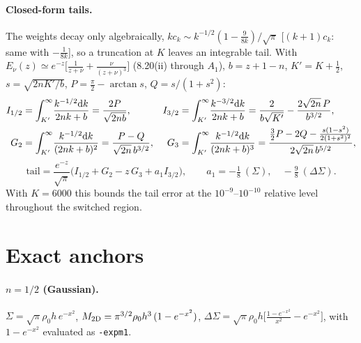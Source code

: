 \documentclass{article}
\begin{document}
\paragraph{Closed-form tails.} The weights decay only algebraically,
$k c_k \sim k^{-1/2}(1-\tfrac{9}{8k})/\sqrt\pi$ [$(k{+}1)c_k$: same with
$-\tfrac1{8k}$], so a truncation at $K$ leaves an integrable tail. With
$E_\nu(z) \simeq e^{-z}\big[\tfrac{1}{z+\nu} + \tfrac{\nu}{(z+\nu)^3}\big]$
(8.20(ii) through $A_1$), $b=z+1-n$, $K'=K+\tfrac12$,
$s=\sqrt{2nK'/b}$, $P=\tfrac\pi2-\arctan s$, $Q=s/(1+s^2)$:
\begin{align}
I_{1/2}&=\int_{K'}^\infty\!\frac{k^{-1/2}{\rm d}k}{2nk+b}
=\frac{2P}{\sqrt{2nb}}, &
I_{3/2}&=\int_{K'}^\infty\!\frac{k^{-3/2}{\rm d}k}{2nk+b}
=\frac{2}{b\sqrt{K'}}-\frac{2\sqrt{2n}\,P}{b^{3/2}},\\
G_2&=\int_{K'}^\infty\!\frac{k^{-1/2}{\rm d}k}{(2nk+b)^2}
=\frac{P-Q}{\sqrt{2n}\,b^{3/2}}, &
G_3&=\int_{K'}^\infty\!\frac{k^{-1/2}{\rm d}k}{(2nk+b)^3}
=\frac{\tfrac32P-2Q-\tfrac{s(1-s^2)}{2(1+s^2)^2}}{2\sqrt{2n}\,b^{5/2}},
\end{align}
\begin{equation}
\text{tail} = \frac{e^{-z}}{\sqrt\pi}\Big(I_{1/2} + G_2 - z\,G_3
+ a_1 I_{3/2}\Big),\qquad
a_1 = -\tfrac18\ (\Sigma),\quad -\tfrac98\ (\Delta\Sigma).
\end{equation}
With $K=6000$ this bounds the tail error at the $10^{-9}$--$10^{-10}$
relative level throughout the switched region.

\section{Exact anchors}\label{sec:anchors}

\paragraph{$n=1/2$ (Gaussian).}
$\Sigma = \sqrt\pi\rho_0 h\,e^{-x^2}$,\quad
$M_{\rm 2D} = \pi^{3/2}\rho_0 h^3\,(1-e^{-x^2})$,\quad
$\Delta\Sigma = \sqrt\pi\rho_0 h\big[\tfrac{1-e^{-x^2}}{x^2} -
e^{-x^2}\big]$, with $1-e^{-x^2}$ evaluated as \texttt{-expm1}.
\end{document}
